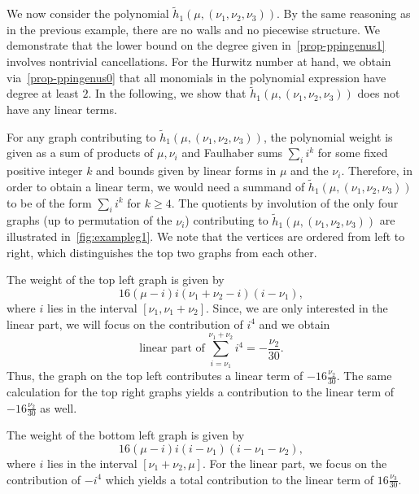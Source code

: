 \documentclass[ALCO,published]{cedram}
\begin{document}
\begin{exam}\label{ex-linearpart}
We now consider the polynomial $\tilde{h}_1(\mu,(\nu_1,\nu_2,\nu_3))$. By the same reasoning as in the previous example, there are no walls and no piecewise structure. We demonstrate that the lower bound on the degree given in~\cref{prop-ppingenus1} involves nontrivial cancellations. For the Hurwitz number at hand, we obtain via~\cref{prop-ppingenus0} that all monomials in the polynomial expression have degree at least $2$. In the following, we show that $\tilde{h}_1(\mu,(\nu_1,\nu_2,\nu_3))$ does not have any linear terms.

For any graph contributing to $\tilde{h}_1(\mu,(\nu_1,\nu_2,\nu_3))$, the polynomial weight is given as a sum of products of $\mu,\nu_i$ and Faulhaber sums $\sum_i i^k$ for some fixed positive integer $k$ and bounds given by linear forms in $\mu$ and the $\nu_i$. Therefore, in order to obtain a linear term, we would need a summand of $\tilde{h}_1(\mu,(\nu_1,\nu_2,\nu_3))$ to be of the form $\sum_i i^k$ for $k\ge 4$. The quotients by involution of the only four graphs (up to permutation of the $\nu_i$) contributing to $\tilde{h}_1(\mu,(\nu_1,\nu_2,\nu_3))$ are illustrated in~\cref{fig:exampleg1}. We note that the vertices are ordered from left to right, which distinguishes the top two graphs from each other.

The weight of the top left graph is given by
\begin{equation*}
    16(\mu-i)i(\nu_1+\nu_2-i)(i-\nu_1),
\end{equation*}
where $i$ lies in the interval $[\nu_1,\nu_1+\nu_2]$.
Since, we are only interested in the linear part, we will focus on the contribution of $i^4$ and we obtain
\begin{equation*}
    \textrm{linear part of}\,\sum_{i=\nu_1}^{\nu_1+\nu_2}i^4=-\frac{\nu_2}{30}.
\end{equation*}
Thus, the graph on the top left contributes a linear term of $-16\frac{\nu_2}{30}$.
The same calculation for the top right graphs yields a contribution to the linear term of $-16\frac{\nu_2}{30}$ as well.

The weight of the bottom left graph is given by
\begin{equation*}
    16(\mu-i)i(i-\nu_1)(i-\nu_1-\nu_2),
\end{equation*}
where $i$ lies in the interval $[\nu_1+\nu_2,\mu]$. For the linear part, we focus on the contribution of $-i^4$ which yields a total contribution to the linear term of $16\frac{\nu_3}{30}$.


\end{exam}
\end{document}
